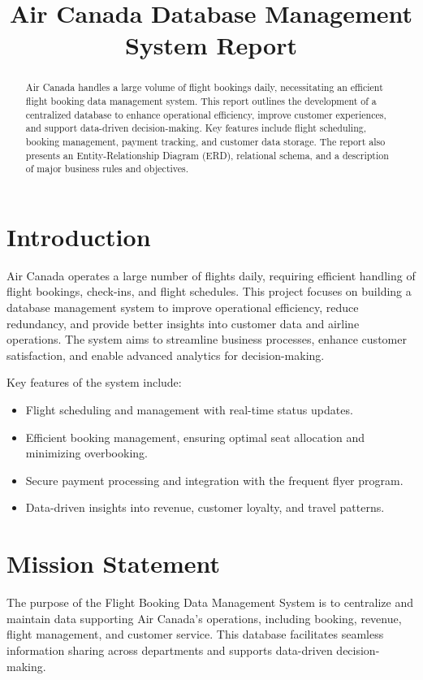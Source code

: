 \documentclass[12pt]{article}
\title{\textbf{Air Canada Database Management System Report}}
\date{} %
\begin{document}
\maketitle

\begin{abstract}
Air Canada handles a large volume of flight bookings daily, necessitating an efficient flight booking data management system. This report outlines the development of a centralized database to enhance operational efficiency, improve customer experiences, and support data-driven decision-making. Key features include flight scheduling, booking management, payment tracking, and customer data storage. The report also presents an Entity-Relationship Diagram (ERD), relational schema, and a description of major business rules and objectives.
\end{abstract}

\section*{Introduction}
Air Canada operates a large number of flights daily, requiring efficient handling of flight bookings, check-ins, and flight schedules. This project focuses on building a database management system to improve operational efficiency, reduce redundancy, and provide better insights into customer data and airline operations. The system aims to streamline business processes, enhance customer satisfaction, and enable advanced analytics for decision-making.

Key features of the system include:
\begin{itemize}
    \item Flight scheduling and management with real-time status updates.
    \item Efficient booking management, ensuring optimal seat allocation and minimizing overbooking.
    \item Secure payment processing and integration with the frequent flyer program.
    \item Data-driven insights into revenue, customer loyalty, and travel patterns.
\end{itemize}

\section*{Mission Statement}
The purpose of the Flight Booking Data Management System is to centralize and maintain data supporting Air Canada’s operations, including booking, revenue, flight management, and customer service. This database facilitates seamless information sharing across departments and supports data-driven decision-making.
\end{document}

